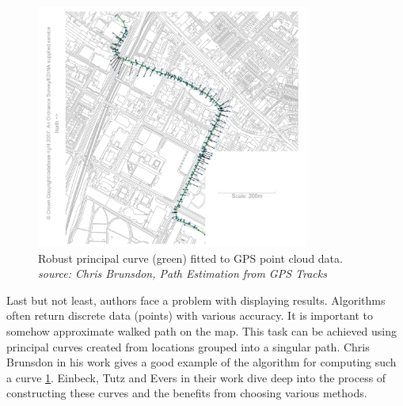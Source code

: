 \begin{figure}[]
    \includegraphics[width=0.8\textwidth]{images/article-map.png}
    \caption{Robust principal curve (green) fitted to GPS point cloud data. \\ \textit{source: Chris Brunsdon, Path Estimation from GPS Tracks}}
    \label{fig:chrismap}
\end{figure}

Last but not least, authors face a problem with displaying results. Algorithms often return discrete data (points) with various accuracy. It is important to somehow approximate walked path on the map. This task can be achieved using principal curves created from locations grouped into a singular path. Chris Brunsdon in his work\cite{cb} gives a good example of the algorithm for computing such a curve \ref{fig:chrismap}. Einbeck, Tutz and Evers in their work\cite{ete} dive deep into the process of constructing these curves and the benefits from choosing various methods.
